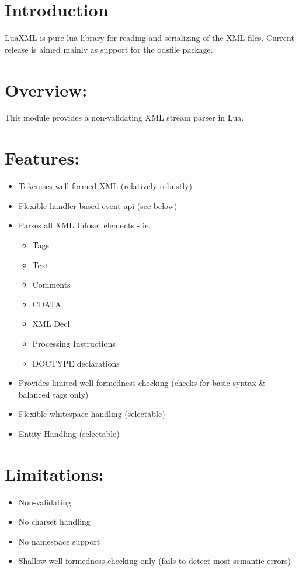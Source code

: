 \documentclass{ltxdoc}
\begin{document}
\section{Introduction}

LuaXML is pure lua library for reading and serializing of the XML files.
Current release is aimed mainly as support for the odsfile package.

\section{Overview:}


This module provides a non-validating XML stream parser in Lua. 
\section{Features:}

\begin{itemize}
\item
  Tokenises well-formed XML (relatively robustly)
\item
  Flexible handler based event api (see below)
\item
  Parses all XML Infoset elements - ie.
  \begin{itemize}
  \item
    Tags
  \item
    Text
  \item
    Comments
  \item
    CDATA
  \item
    XML Decl
  \item
    Processing Instructions
  \item
    DOCTYPE declarations
  \end{itemize}
\item
  Provides limited well-formedness checking (checks for basic syntax \&
  balanced tags only)
\item
  Flexible whitespace handling (selectable)
\item
  Entity Handling (selectable)
\end{itemize}
\section{Limitations:}

\begin{itemize}
\item
  Non-validating
\item
  No charset handling
\item
  No namespace support
\item
  Shallow well-formedness checking only (fails to detect most semantic
  errors)
\end{itemize}
\end{document}
